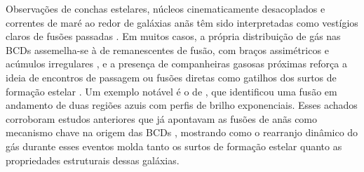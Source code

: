 Observações de conchas estelares, núcleos cinematicamente desacoplados e correntes de maré ao redor de galáxias anãs têm sido interpretadas como vestígios claros de fusões passadas \citep{Geha_2005, Rich_2012, Penny_2012, Toloba_2014, Daya_2022}. Em muitos casos, a própria distribuição de gás nas BCDs assemelha-se à de remanescentes de fusão, com braços assimétricos e acúmulos irregulares \citep{Ekta_2008}, e a presença de companheiras gasosas próximas reforça a ideia de encontros de passagem ou fusões diretas como gatilhos dos surtos de formação estelar \citep{Pustilnik_2001}. Um exemplo notável é o de \cite{Pak_2016}, que identificou uma fusão em andamento de duas regiões azuis com perfis de brilho exponenciais. Esses achados corroboram estudos anteriores que já apontavam as fusões de anãs como mecanismo chave na origem das BCDs \citep{Noeske_2001, Ostlin_2001, Bekki_2008}, mostrando como o rearranjo dinâmico do gás durante esses eventos molda tanto os surtos de formação estelar quanto as propriedades estruturais dessas galáxias.





